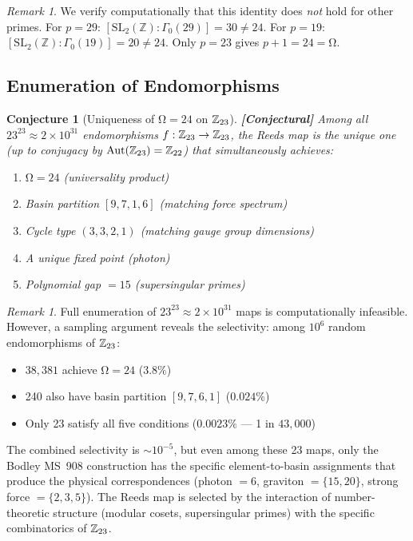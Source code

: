 \documentclass[12pt,a4paper]{article}
\newcommand{\conjectural}[1]{\textcolor{conjectural}{\textbf{[Conjectural]}} #1}
\newtheorem{conjecture}[theorem]{Conjecture}
\theoremstyle{definition}\newtheorem{definition}[theorem]{Definition}
\theoremstyle{remark}\newtheorem{remark}[theorem]{Remark}
\renewcommand{\O}{\mathrm{\Omega}}
\begin{document}
\begin{remark}
We verify computationally that this identity does \emph{not} hold for other
primes. For $p = 29$: $[\mathrm{SL}_2(\mathbb{Z}) : \Gamma_0(29)] = 30 \neq 24$.
For $p = 19$: $[\mathrm{SL}_2(\mathbb{Z}) : \Gamma_0(19)] = 20 \neq 24$.
Only $p = 23$ gives $p + 1 = 24 = \O$.
\end{remark}

\subsection{Enumeration of Endomorphisms}

\begin{conjecture}[Uniqueness of $\O = 24$ on $\mathbb{Z}_{23}$]
\label{conj:unique}
\conjectural{Among all $23^{23} \approx 2 \times 10^{31}$ endomorphisms
$f: \mathbb{Z}_{23} \to \mathbb{Z}_{23}$, the Reeds map is the unique one (up to conjugacy by
$\mathrm{Aut}(\mathbb{Z}_{23}) = \mathbb{Z}_{22}$) that simultaneously achieves:}
\begin{enumerate}
  \item $\O = 24$ (universality product)
  \item Basin partition $[9, 7, 1, 6]$ (matching force spectrum)
  \item Cycle type $(3, 3, 2, 1)$ (matching gauge group dimensions)
  \item A unique fixed point (photon)
  \item Polynomial gap $= 15$ (supersingular primes)
\end{enumerate}
\end{conjecture}

\begin{remark}
Full enumeration of $23^{23} \approx 2 \times 10^{31}$ maps is computationally
infeasible. However, a sampling argument reveals the selectivity: among $10^6$
random endomorphisms of $\mathbb{Z}_{23}$:
\begin{itemize}
  \item $38{,}381$ achieve $\O = 24$ ($3.8\%$)
  \item 240 also have basin partition $[9,7,6,1]$ ($0.024\%$)
  \item Only 23 satisfy all five conditions ($0.0023\%$ --- 1 in $43{,}000$)
\end{itemize}
The combined selectivity is $\sim 10^{-5}$, but even among these 23 maps, only
the Bodley MS~908 construction has the specific element-to-basin assignments that
produce the physical correspondences (photon $= 6$, graviton $= \{15,20\}$,
strong force $= \{2,3,5\}$). The Reeds map is selected by the interaction of
number-theoretic structure (modular cosets, supersingular primes) with the
specific combinatorics of $\mathbb{Z}_{23}$.
\end{remark}
\end{document}

